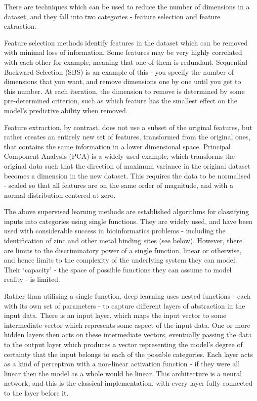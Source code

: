 There are techniques which can be used to reduce the number of dimensions in a dataset, and they fall into two categories - feature selection and feature extraction.

Feature selection methods identify features in the dataset which can be removed with minimal loss of information. Some features may be very highly correlated with each other for example, meaning that one of them is redundant. Sequential Backward Selection (SBS) is an example of this - you specify the number of dimensions that you want, and remove dimensions one by one until you get to this number. At each iteration, the dimension to remove is determined by some pre-determined criterion, such as which feature has the smallest effect on the model's predictive ability when removed.


Feature extraction, by contrast, does not use a subset of the original features, but rather creates an entirely new set of features, transformed from the original ones, that contains the same information in a lower dimensional space. Principal Component Analysis (PCA) is a widely used example, which transforms the original data such that the direction of maximum variance in the original dataset becomes a dimension in the new dataset. This requires the data to be normalised - scaled so that all features are on the same order of magnitude, and with a normal distribution centered at zero. 

The above supervised learning methods are established algorithms for classifying inputs into categories using single functions. They are widely used, and have been used with considerable success in bioinformatics problems - including the identification of zinc and other metal binding sites (see below). However, there are limits to the discriminatory power of a single function, linear or otherwise, and hence limits to the complexity of the underlying system they can model. Their `capacity' - the space of possible functions they can assume to model reality - is limited.

Rather than utilising a single function, deep learning uses nested functions - each with its own set of parameters - to capture different layers of abstraction in the input data. There is an input layer, which maps the input vector to some intermediate vector which represents some aspect of the input data. One or more hidden layers then acts on these intermediate vectors, eventually passing the data to the output layer which produces a vector representing the model's degree of certainty that the input belongs to each of the possible categories. Each layer acts as a kind of perceptron with a non-linear activation function - if they were all linear then the model as a whole would be linear. This architecture is a neural network, and this is the classical implementation, with every layer fully connected to the layer before it.


